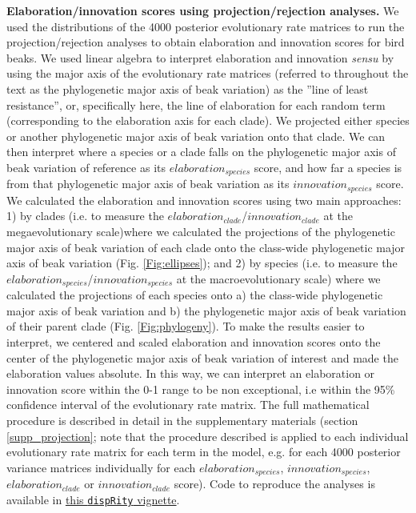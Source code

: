 \documentclass[12pt,letterpaper]{article}
\begin{document}
\textbf{Elaboration/innovation scores using projection/rejection analyses.} We used the distributions of the 4000 posterior evolutionary rate matrices to run the projection/rejection analyses to obtain elaboration and innovation scores for bird beaks.
We used linear algebra to interpret elaboration and innovation \textit{sensu} \cite{endler2005animal} by using the major axis of the evolutionary rate matrices (referred to throughout the text as the phylogenetic major axis of beak variation) as the ''line of least resistance'', or, specifically here, the line of elaboration for each random term (corresponding to the elaboration axis for each clade).
We projected either species or another phylogenetic major axis of beak variation onto that clade.
We can then interpret where a species or a clade falls on the phylogenetic major axis of beak variation of reference as its $elaboration_{species}$ score, and how far a species is from that phylogenetic major axis of beak variation as its $innovation_{species}$ score.
We calculated the elaboration and innovation scores using two main approaches: 1) by clades (i.e.
to measure the $elaboration_{clade}$/$innovation_{clade}$ at the megaevolutionary scale)where we calculated the projections of the phylogenetic major axis of beak variation of each clade onto the class-wide phylogenetic major axis of beak variation (Fig. \ref{Fig:ellipses}); and 2) by species (i.e.
to measure the $elaboration_{species}$/$innovation_{species}$ at the macroevolutionary scale) where we calculated the projections of each species onto a) the class-wide phylogenetic major axis of beak variation and b) the phylogenetic major axis of beak variation of their parent clade (Fig. \ref{Fig:phylogeny}).
To make the results easier to interpret, we centered and scaled elaboration and innovation scores onto the center of the phylogenetic major axis of beak variation of interest and made the elaboration values absolute.
In this way, we can interpret an elaboration or innovation score within the 0-1 range to be non exceptional, i.e within the 95\% confidence interval of the evolutionary rate matrix.
The full mathematical procedure is described in detail in the supplementary materials (section \ref{supp_projection};  note that the procedure described is applied to each individual evolutionary rate matrix for each term in the model, e.g. for each 4000 posterior variance matrices individually for each $elaboration_{species}$, $innovation_{species}$, $elaboration_{clade}$ or $innovation_{clade}$ score). %
Code to reproduce the analyses is available in \href{https://raw.rawgit.net/TGuillerme/dispRity/master/inst/vignettes/Projection_analysis.html}{this \texttt{dispRity} vignette}.
\end{document}
